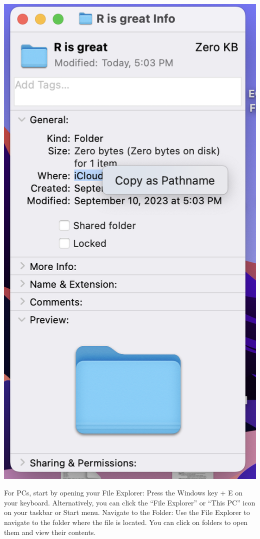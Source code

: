\documentclass[
]{book}
\begin{document}
\includegraphics{images/01-intro/copyingpathnamemac.png}

For PCs, start by opening your File Explorer:
Press the Windows key + E on your keyboard.
Alternatively, you can click the ``File Explorer'' or ``This PC'' icon on your taskbar or Start menu.
Navigate to the Folder: Use the File Explorer to navigate to the folder where the file is located. You can click on folders to open them and view their contents.
\end{document}
